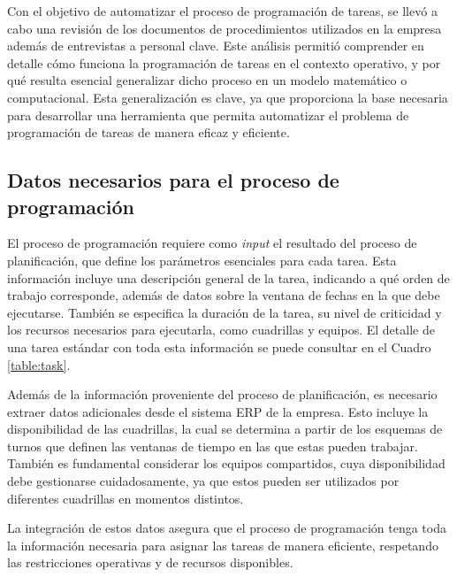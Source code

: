 \documentclass{article}
\begin{document}
Con el objetivo de automatizar el proceso de programación de tareas, se llevó a cabo una revisión de los documentos de procedimientos utilizados en la empresa además de entrevistas a personal clave. Este análisis permitió comprender en detalle cómo funciona la programación de tareas en el contexto operativo, y por qué resulta esencial generalizar dicho proceso en un modelo matemático o computacional. Esta generalización es clave, ya que proporciona la base necesaria para desarrollar una herramienta que permita automatizar el problema de programación de tareas de manera eficaz y eficiente.

\subsection{Datos necesarios para el proceso de programación}  

El proceso de programación requiere como \textit{input} el resultado del proceso de planificación, que define los parámetros esenciales para cada tarea. Esta información incluye una descripción general de la tarea, indicando a qué orden de trabajo corresponde, además de datos sobre la ventana de fechas en la que debe ejecutarse. También se especifica la duración de la tarea, su nivel de criticidad y los recursos necesarios para ejecutarla, como cuadrillas y equipos. El detalle de una tarea estándar con toda esta información se puede consultar en el Cuadro \ref{table:task}.  

Además de la información proveniente del proceso de planificación, es necesario extraer datos adicionales desde el sistema ERP de la empresa. Esto incluye la disponibilidad de las cuadrillas, la cual se determina a partir de los esquemas de turnos que definen las ventanas de tiempo en las que estas pueden trabajar. También es fundamental considerar los equipos compartidos, cuya disponibilidad debe gestionarse cuidadosamente, ya que estos pueden ser utilizados por diferentes cuadrillas en momentos distintos.  

La integración de estos datos asegura que el proceso de programación tenga toda la información necesaria para asignar las tareas de manera eficiente, respetando las restricciones operativas y de recursos disponibles.  
\end{document}
